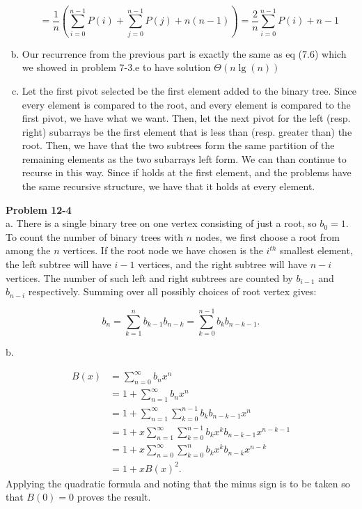 \documentclass{article}
\begin{document}
\begin{enumerate}[a.]
\[
=  \frac{1}{n}\left(\sum_{i=0}^{n-1}P(i) + \sum_{j=0}^{n-1}P(j) + n(n-1)\right) = \frac{2}{n} \sum_{i=0}^{n-1} P(i) + n-1
\]

\item
Our recurrence from the previous part is exactly the same as eq (7.6) which we showed in problem 7-3.e to have solution $\Theta(n\lg(n))$

\item
Let the first pivot selected be the first element added to the binary tree. Since every element is compared to the root, and every element is compared to the first pivot, we have what we want. Then, let the next pivot for the left (resp. right) subarrays be the first element that is less than (resp. greater than) the root. Then, we have that the two subtrees form the same partition of the remaining elements as the two subarrays left form. We can than continue to recurse in this way. Since if holds at the first element, and the problems have the same recursive structure, we have that it holds at every element.

\end{enumerate}

\noindent\textbf{Problem 12-4}\\

a. There is a single binary tree on one vertex consisting of just a root, so $b_0 = 1$.  To count the number of binary trees with $n$ nodes, we first choose a root from among the $n$ vertices.  If the root node we have chosen is the $i^{th}$ smallest element, the left subtree will have $i-1$ vertices, and the right subtree will have $n-i$ vertices.  The number of such left and right subtrees are counted by $b_{i-1}$ and $b_{n-i}$ respectively.  Summing over all possibly choices of root vertex gives:

\[ b_n = \sum_{k=1}^n b_{k-1}b_{n-k} = \sum_{k=0}^{n-1} b_kb_{n-k-1}.\]

b. 

\begin{align*}
B(x) &= \sum_{n=0}^\infty b_nx^n \\
&= 1 + \sum_{n=1}^\infty b_nx^n \\
&= 1+ \sum_{n=1}^\infty  \sum_{k=0}^{n-1} b_kb_{n-k-1} x^n \\
&= 1+ x\sum_{n=1}^\infty  \sum_{k=0}^{n-1} b_kx^kb_{n-k-1} x^{n-k-1} \\
&= 1+ x\sum_{n=0}^\infty  \sum_{k=0}^{n} b_kx^kb_{n-k} x^{n-k} \\
&= 1 + xB(x)^2.
\end{align*}
Applying the quadratic formula and noting that the minus sign is to be taken so that $B(0) = 0$ proves the result. \\
\end{document}
